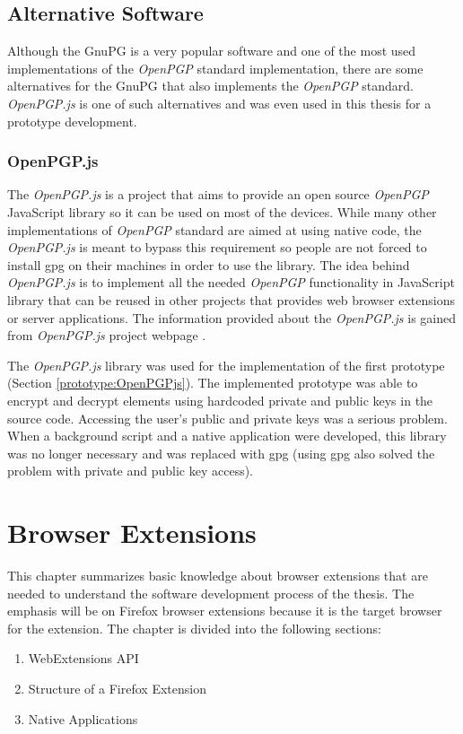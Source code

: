\section{Alternative Software}
Although the GnuPG is a very popular software and one of the most used implementations of the \textit{OpenPGP} standard implementation, there are some alternatives for the GnuPG that also implements the \textit{OpenPGP} standard. \textit{OpenPGP.js} is one of such alternatives and was even used in this thesis for a prototype development.

\subsection*{OpenPGP.js}
\label{text:openpgpjs}
The \textit{OpenPGP.js} is a project that aims to provide an open source \textit{OpenPGP} JavaScript library so it can be used on most of the devices. While many other implementations of \textit{OpenPGP} standard are aimed at using native code, the \textit{OpenPGP.js} is meant to bypass this requirement so people are not forced to install gpg on their machines in order to use the library. The idea behind \textit{OpenPGP.js} is to implement all the needed \textit{OpenPGP} functionality in JavaScript library that can be reused in other projects that provides web browser extensions or server applications. The information provided about the \textit{OpenPGP.js} is gained from \textit{OpenPGP.js} project webpage \cite{OpenPGPjs}.

The \textit{OpenPGP.js} library was used for the implementation of the first prototype (Section \ref{prototype:OpenPGPjs}). The implemented prototype was able to encrypt and decrypt elements using hardcoded private and public keys in the source code. Accessing the user's public and private keys was a serious problem. When a background script and a native application were developed, this library was no longer necessary and was replaced with gpg (using gpg also solved the problem with private and public key access).

\chapter{Browser Extensions}
This chapter summarizes basic knowledge about browser extensions that are needed to understand the software development process of the thesis. The emphasis will be on Firefox browser extensions because it is the target browser for the extension. The chapter is divided into the following sections:
\begin{enumerate}
    \item WebExtensions API
    \item Structure of a Firefox Extension
    \item Native Applications
\end{enumerate}

